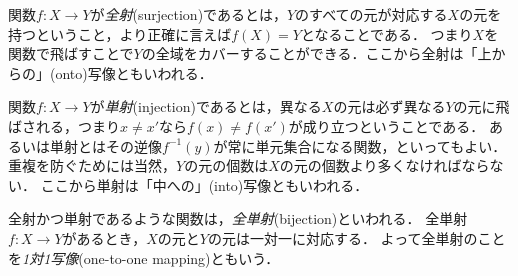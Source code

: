 \documentclass[dvipdfmx, 11pt,a4paper]{jsarticle}
\begin{document}
関数$f:X \to Y$が\emph{全射}(surjection)であるとは，$Y$のすべての元が対応する$X$の元を持つということ，より正確に言えば$f(X)=Y$となることである．
つまり$X$を関数で飛ばすことで$Y$の全域をカバーすることができる．ここから全射は「上からの」(onto)写像ともいわれる．

関数$f:X \to Y$が\emph{単射}(injection)であるとは，異なる$X$の元は必ず異なる$Y$の元に飛ばされる，つまり$x \neq x'$なら$f(x) \neq f(x')$が成り立つということである．
あるいは単射とはその逆像$f^{-1}(y)$が常に単元集合になる関数，といってもよい．
重複を防ぐためには当然，$Y$の元の個数は$X$の元の個数より多くなければならない．
ここから単射は「中への」(into)写像ともいわれる．

全射かつ単射であるような関数は，\emph{全単射}(bijection)といわれる．
全単射$f:X \to Y$があるとき，$X$の元と$Y$の元は一対一に対応する．
よって全単射のことを\emph{1対1写像}(one-to-one mapping)ともいう．
\end{document}
